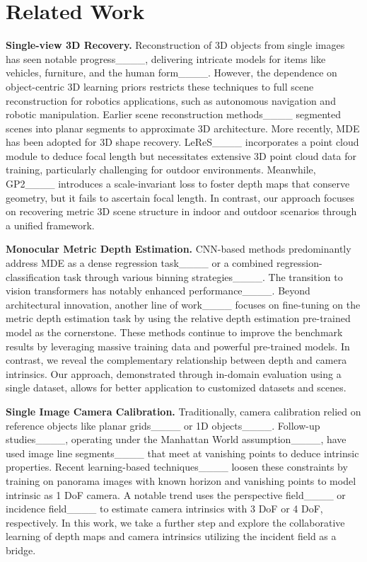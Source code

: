 \section{Related Work}
\textbf{Single-view 3D Recovery.}
Reconstruction of 3D objects from single images has seen notable progress____, delivering intricate models for items like vehicles, furniture, and the human form____. However, the dependence on object-centric 3D learning priors restricts these techniques to full scene reconstruction for robotics applications, such as autonomous navigation and robotic manipulation. Earlier scene reconstruction methods____ segmented scenes into planar segments to approximate 3D architecture. More recently, MDE has been adopted for 3D shape recovery. LeReS____ incorporates a point cloud module to deduce focal length but necessitates extensive 3D point cloud data for training, particularly challenging for outdoor environments. Meanwhile, GP2____ introduces a scale-invariant loss to foster depth maps that conserve geometry, but it fails to ascertain focal length. In contrast, our approach focuses on recovering metric 3D scene structure in indoor and outdoor scenarios through a unified framework.

\textbf{Monocular Metric Depth Estimation.}
CNN-based methods predominantly address MDE as a dense regression task____ or a combined regression-classification task through various binning strategies____. The transition to vision transformers has notably enhanced performance____. 
Beyond architectural innovation, another line of work____ focuses on fine-tuning on the metric depth estimation task by using the relative depth estimation pre-trained model as the cornerstone. These methods continue to improve the benchmark results by leveraging massive training data and powerful pre-trained models. In contrast, we reveal the complementary relationship between depth and camera intrinsics. Our approach, demonstrated through in-domain evaluation using a single dataset, allows for better application to customized datasets and scenes.


\textbf{Single Image Camera Calibration.}
Traditionally, camera calibration relied on reference objects like planar grids____ or 1D objects____. Follow-up studies____, operating under the Manhattan World assumption____, have used image line segments____ that meet at vanishing points to deduce intrinsic properties. Recent learning-based techniques____ loosen these constraints by training on panorama images with known horizon and vanishing points to model intrinsic as 1 DoF camera. A notable trend uses the perspective field____ or incidence field____ to estimate camera intrinsics with 3 DoF or 4 DoF, respectively. In this work, we take a further step and explore the collaborative learning of depth maps and camera intrinsics utilizing the incident field as a bridge.

